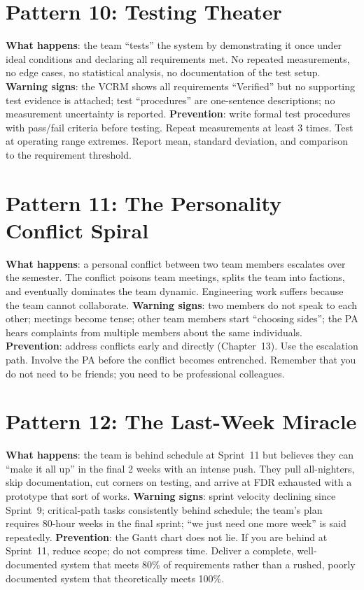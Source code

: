 \section*{Pattern 10: Testing Theater}
\textbf{What happens}: the team ``tests'' the system by demonstrating it once under ideal conditions and declaring all requirements met. No repeated measurements, no edge cases, no statistical analysis, no documentation of the test setup.
\textbf{Warning signs}: the VCRM shows all requirements ``Verified'' but no supporting test evidence is attached; test ``procedures'' are one-sentence descriptions; no measurement uncertainty is reported.
\textbf{Prevention}: write formal test procedures with pass/fail criteria before testing. Repeat measurements at least 3 times. Test at operating range extremes. Report mean, standard deviation, and comparison to the requirement threshold.

\section*{Pattern 11: The Personality Conflict Spiral}
\textbf{What happens}: a personal conflict between two team members escalates over the semester. The conflict poisons team meetings, splits the team into factions, and eventually dominates the team dynamic. Engineering work suffers because the team cannot collaborate.
\textbf{Warning signs}: two members do not speak to each other; meetings become tense; other team members start ``choosing sides''; the PA hears complaints from multiple members about the same individuals.
\textbf{Prevention}: address conflicts early and directly (Chapter~13). Use the escalation path. Involve the PA before the conflict becomes entrenched. Remember that you do not need to be friends; you need to be professional colleagues.

\section*{Pattern 12: The Last-Week Miracle}
\textbf{What happens}: the team is behind schedule at Sprint~11 but believes they can ``make it all up'' in the final 2 weeks with an intense push. They pull all-nighters, skip documentation, cut corners on testing, and arrive at FDR exhausted with a prototype that sort of works.
\textbf{Warning signs}: sprint velocity declining since Sprint~9; critical-path tasks consistently behind schedule; the team's plan requires 80-hour weeks in the final sprint; ``we just need one more week'' is said repeatedly.
\textbf{Prevention}: the Gantt chart does not lie. If you are behind at Sprint~11, reduce scope; do not compress time. Deliver a complete, well-documented system that meets 80\% of requirements rather than a rushed, poorly documented system that theoretically meets 100\%.





